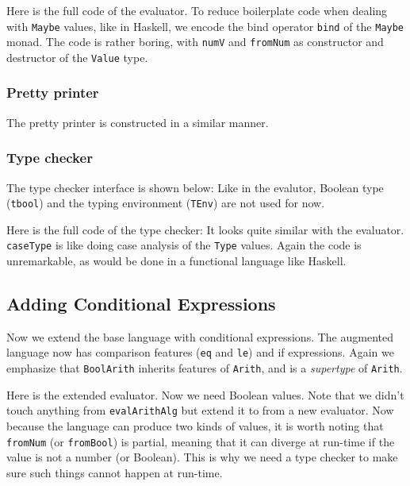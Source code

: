 Here is the full code of the evaluator.
To reduce boilerplate code when dealing with \lstinline{Maybe} values, like in
Haskell, we encode the bind operator \lstinline{bind} of the \lstinline{Maybe}
monad. The code is rather boring, with \lstinline{numV} and \lstinline{fromNum}
as constructor and destructor of the \lstinline{Value} type.

\subsubsection{Pretty printer}

The pretty printer is constructed in a similar manner.

\subsubsection{Type checker}

The type checker interface is shown below:
Like in the evalutor, Boolean type (\lstinline{tbool}) and the typing
environment (\lstinline{TEnv}) are not used for now.

Here is the full code of the type checker:
It looks quite similar with the evaluator. \lstinline{caseType} is like doing
case analysis of the \lstinline{Type} values. Again the code is unremarkable, as
would be done in a functional language like Haskell.


\subsection{Adding Conditional Expressions}

Now we extend the base language with conditional expressions.
The augmented language now has comparison features (\lstinline{eq} and
\lstinline{le}) and if expressions. Again we emphasize that
\lstinline{BoolArith} inherits features of \lstinline{Arith}, and is a
\textit{supertype} of \lstinline{Arith}.

Here is the extended evaluator. Now we need Boolean values.
Note that we didn't touch anything from \lstinline{evalArithAlg} but extend it
to from a new evaluator. Now because the language can produce two kinds of
values, it is worth noting that \lstinline{fromNum} (or \lstinline{fromBool}) is
partial, meaning that it can diverge at run-time if the value is not a number
(or Boolean). This is why we need a type checker to make sure such things cannot
happen at run-time.

